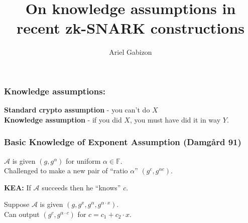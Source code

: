 \documentclass[shadesubsections,trans,14pt,mathserif]{beamer}
\title{\LARGE{On knowledge assumptions in recent zk-SNARK constructions}}    %
\author{\Large{Ariel Gabizon}}                 %
\institute{\normalsize{Protocol Labs}}      %
\date{}                    %
\newcommand{\adv}{\ensuremath{\mathcal A}}
\newcommand{\F}{\ensuremath{\mathbb F}}
\begin{document}
\boldmath
\begin{frame}
  \titlepage
\end{frame}



\begin{frame}
  \frametitle{Knowledge assumptions:}   %
\textbf{Standard crypto assumption} - you can't do $X$\\
 \vspace{0.4in}
\textbf{Knowledge assumption} - if you did $X$, you must have did it in way $Y$.
 \vspace{0.4in}

\end{frame}



\begin{frame}
  \frametitle{Basic Knowledge of Exponent Assumption (Damg{\aa}rd 91)}   %
 $\adv$ is given $(g,g^\alpha)$ for uniform $\alpha \in \F$.\\
 \vspace{0.4in}
Challenged to make a new pair of ``ratio $\alpha$'' $(g^c,g^{\alpha c})$.

 \vspace{0.4in}

\textbf{KEA:} If $\adv$ succeeds then he ``knows'' $c$.
 
\end{frame}

\begin{frame}
 Suppose $\adv$ is given $(g,g^x,g^\alpha,g^{\alpha \cdot x})$.\\
 \vspace{0.4in}
Can output $(g^c,g^{\alpha\cdot c})$ for $c=c_1 + c_2\cdot x$. 
\end{frame}
\end{document}
